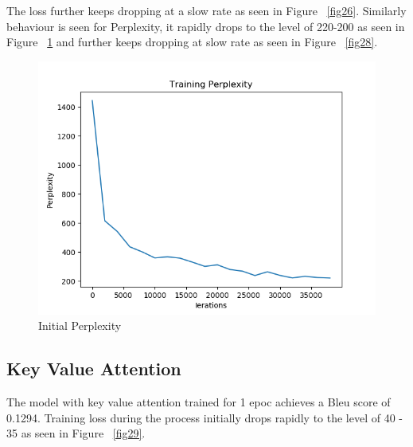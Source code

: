 \documentclass[11pt,a4paper]{article}
\begin{document}
The loss further keeps dropping at a slow rate as seen in Figure ~\ref{fig26}. Similarly behaviour is seen for Perplexity, it rapidly drops to the level of 220-200 as seen in Figure ~\ref{fig27} and further keeps dropping at slow rate as seen in Figure ~\ref{fig28}.


\begin{figure}[!htbp]
\includegraphics[width=\linewidth]{de_add_ppl_1.png}
\caption{Initial Perplexity}
\label{fig27}
\end{figure}


\pagebreak
\subsection{Key Value Attention}

The model with key value attention trained for 1 epoc achieves a Bleu score of 0.1294.
Training loss during the process initially drops rapidly to the level of 40 - 35 as seen in Figure ~\ref{fig29}. 
\end{document}
